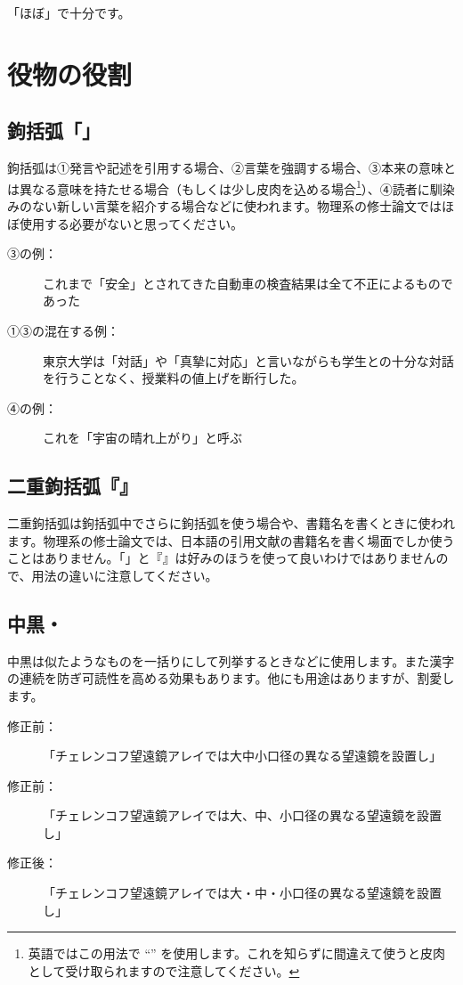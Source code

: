 「ほぼ」で十分です。

\section{役物の役割}

\subsection{鉤括弧「」}

鉤括弧は①発言や記述を引用する場合、②言葉を強調する場合、③本来の意味とは異なる意味を持たせる場合（もしくは少し皮肉を込める場合\footnote{英語ではこの用法で ``'' を使用します。これを知らずに間違えて使うと皮肉として受け取られますので注意してください。}）、④読者に馴染みのない新しい言葉を紹介する場合などに使われます。物理系の修士論文ではほぼ使用する必要がないと思ってください。

\begin{description}
\item[③の例：]これまで「安全」とされてきた自動車の検査結果は全て不正によるものであった
\item[①③の混在する例：]東京大学は「対話」や「真摯に対応」と言いながらも学生との十分な対話を行うことなく、授業料の値上げを断行した。
\item[④の例：]これを「宇宙の晴れ上がり」と呼ぶ
\end{description}

\subsection{二重鉤括弧『』}

二重鉤括弧は鉤括弧中でさらに鉤括弧を使う場合や、書籍名を書くときに使われます。物理系の修士論文では、日本語の引用文献の書籍名を書く場面でしか使うことはありません。「」と『』は好みのほうを使って良いわけではありませんので、用法の違いに注意してください。

\subsection{中黒・}

中黒は似たようなものを一括りにして列挙するときなどに使用します。また漢字の連続を防ぎ可読性を高める効果もあります。他にも用途はありますが、割愛します。

\begin{description}
\item[修正前：]「チェレンコフ望遠鏡アレイでは大中小口径の異なる望遠鏡を設置し」
\item[修正前：]「チェレンコフ望遠鏡アレイでは大、中、小口径の異なる望遠鏡を設置し」
\item[修正後：]「チェレンコフ望遠鏡アレイでは大・中・小口径の異なる望遠鏡を設置し」
\end{description}

